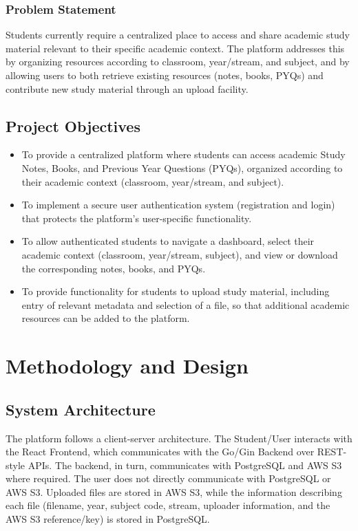 \documentclass[12pt]{report}
\begin{document}
\subsection{Problem Statement}
Students currently require a centralized place to access and share academic study material
relevant to their specific academic context. The platform addresses this by organizing resources
according to classroom, year/stream, and subject, and by allowing users to both retrieve
existing resources (notes, books, PYQs) and contribute new study material through an upload
facility.

\section{Project Objectives}
\begin{itemize}[leftmargin=*]
    \item To provide a centralized platform where students can access academic Study Notes,
    Books, and Previous Year Questions (PYQs), organized according to their academic
    context (classroom, year/stream, and subject).
    \item To implement a secure user authentication system (registration and login) that
    protects the platform's user-specific functionality.
    \item To allow authenticated students to navigate a dashboard, select their academic context
    (classroom, year/stream, subject), and view or download the corresponding notes,
    books, and PYQs.
    \item To provide functionality for students to upload study material, including entry of
    relevant metadata and selection of a file, so that additional academic resources can be
    added to the platform.
\end{itemize}

\chapter{Methodology and Design}

\section{System Architecture}
The platform follows a client-server architecture. The Student/User interacts with the React
Frontend, which communicates with the Go/Gin Backend over REST-style APIs. The backend,
in turn, communicates with PostgreSQL and AWS S3 where required. The user does not
directly communicate with PostgreSQL or AWS S3. Uploaded files are stored in AWS S3,
while the information describing each file (filename, year, subject code, stream, uploader
information, and the AWS S3 reference/key) is stored in PostgreSQL.
\end{document}
